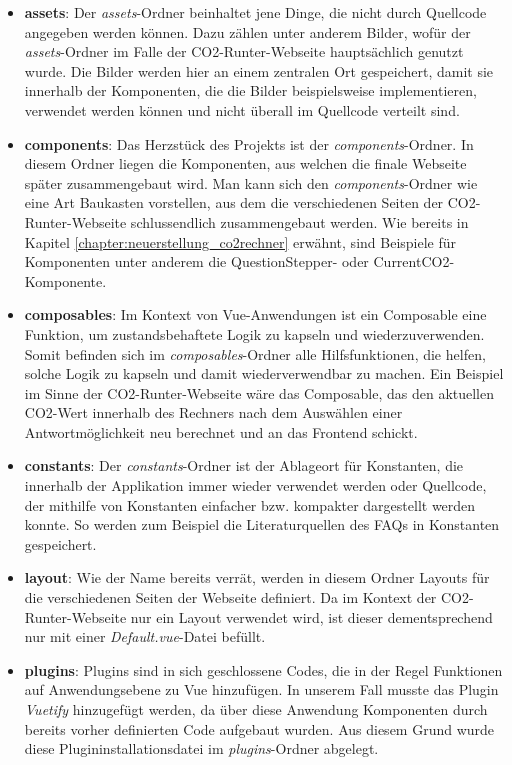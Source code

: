 \begin{itemize}
    \item \textbf{assets}: Der \textit{assets}-Ordner beinhaltet jene Dinge, die nicht durch Quellcode angegeben werden können. Dazu zählen unter anderem Bilder, wofür der \textit{assets}-Ordner im Falle der CO2-Runter-Webseite hauptsächlich genutzt wurde. Die Bilder werden hier an einem zentralen Ort gespeichert, damit sie innerhalb der Komponenten, die die Bilder beispielsweise implementieren, verwendet werden können und nicht überall im Quellcode verteilt sind.
    \item \textbf{components}: Das Herzstück des Projekts ist der \textit{components}-Ordner. In diesem Ordner liegen die Komponenten, aus welchen die finale Webseite später zusammengebaut wird. Man kann sich den \textit{components}-Ordner wie eine Art Baukasten vorstellen, aus dem die verschiedenen Seiten der CO2-Runter-Webseite schlussendlich zusammengebaut werden. Wie bereits in Kapitel \ref{chapter:neuerstellung_co2rechner} erwähnt, sind Beispiele für Komponenten unter anderem die QuestionStepper- oder CurrentCO2-Komponente.
    \item \textbf{composables}: Im Kontext von Vue-Anwendungen ist ein Composable eine Funktion, um zustandsbehaftete Logik zu kapseln und wiederzuverwenden. Somit befinden sich im \textit{composables}-Ordner alle Hilfsfunktionen, die helfen, solche Logik zu kapseln und damit wiederverwendbar zu machen. Ein Beispiel im Sinne der CO2-Runter-Webseite wäre das Composable, das den aktuellen CO2-Wert innerhalb des Rechners nach dem Auswählen einer Antwortmöglichkeit neu berechnet und an das Frontend schickt.
    \item \textbf{constants}: Der \textit{constants}-Ordner ist der Ablageort für Konstanten, die innerhalb der Applikation immer wieder verwendet werden oder Quellcode, der mithilfe von Konstanten einfacher bzw. kompakter dargestellt werden konnte. So werden zum Beispiel die Literaturquellen des FAQs in Konstanten gespeichert.
    \item \textbf{layout}: Wie der Name bereits verrät, werden in diesem Ordner Layouts für die verschiedenen Seiten der Webseite definiert. Da im Kontext der CO2-Runter-Webseite nur ein Layout verwendet wird, ist dieser dementsprechend nur mit einer \textit{Default.vue}-Datei befüllt.
    \item \textbf{plugins}: Plugins sind in sich geschlossene Codes, die in der Regel Funktionen auf Anwendungsebene zu Vue hinzufügen. In unserem Fall musste das Plugin \textit{Vuetify} hinzugefügt werden, da über diese Anwendung Komponenten durch bereits vorher definierten Code aufgebaut wurden. Aus diesem Grund wurde diese Plugininstallationsdatei im \textit{plugins}-Ordner abgelegt.

\end{itemize}
